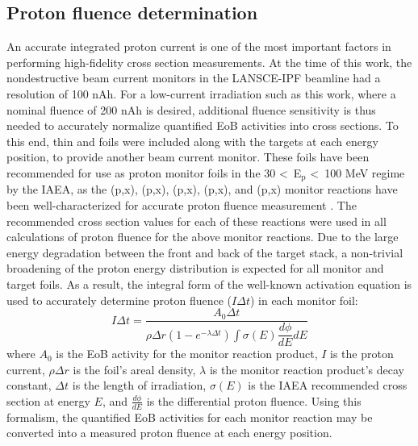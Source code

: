 \documentclass[%
 reprint,
superscriptaddress,
onecolumn,
linenumbers,
notitlepage,
 amsmath,amssymb,
 aps,
prc,
]{revtex4-1}
\newcommand{\pp}[1]{\left( #1\right)}
\newcommand{\comment}[1]{\todo[color=blue!20!white,inline]{ASV: #1}}
\begin{document}


\subsection{Proton fluence determination}\label{sec:dosimetry}



An accurate integrated proton current is one of the most important factors in performing high-fidelity cross section measurements.
At the time of this work, the nondestructive beam current monitors in the LANSCE-IPF beamline had a  resolution of 100 nAh.
For a low-current irradiation such as this work, where a nominal fluence of 200 nAh is desired, additional fluence sensitivity is thus needed to accurately normalize quantified EoB activities into cross sections.
To this end, thin  and  foils were included along with the  targets at each energy position, to provide another beam current monitor.
These foils have been recommended for use as proton monitor foils in the 30 \textless\ E$_\text{p}$ \textless\ 100 MeV regime by the IAEA, as the (p,x), (p,x), (p,x), (p,x), and (p,x) monitor reactions have been well-characterized for accurate proton fluence measurement \cite{gul2001charged}.
The recommended cross section values for each of these reactions were used in all calculations of proton fluence for the above monitor reactions.
Due to the large energy degradation between the front and  back of the target stack, a non-trivial broadening of the proton energy distribution is expected for all monitor and target foils.
As a result, the integral form of the well-known activation equation is used to accurately determine proton fluence ($I \Delta t $) in each monitor foil:
\begin{equation}
I \Delta t = \dfrac{A_0 \Delta t}{\rho \Delta r \pp{1-e^{-\lambda \Delta t}} \int \sigma\pp{E} \dfrac{d\phi}{dE} dE}
\end{equation}
where $A_0$ is the EoB activity for the monitor reaction product, $I$ is the proton current, $\rho \Delta r$ is the foil's areal density, $\lambda$ is the monitor reaction product's decay constant, $\Delta t$ is the length of irradiation, $\sigma\pp{E}$ is the IAEA recommended cross section at energy $E$, and $\frac{d\phi}{dE}$ is the differential proton fluence.
Using this formalism, the quantified EoB activities for each monitor reaction may be converted into a measured proton fluence at each energy position.
\end{document}
